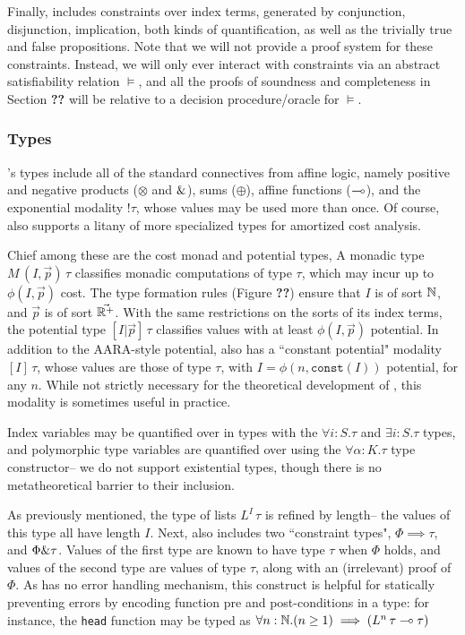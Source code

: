 Finally, \dlambdaamor includes constraints over index terms, generated by conjunction, disjunction, implication, both kinds of quantification, as well as the trivially true and false propositions. Note that we will not provide a proof system for these constraints. Instead, we will only ever interact with constraints via an abstract satisfiability relation $\vDash$, and all the proofs of soundness and completeness in Section \textbf{??} will be relative to a decision procedure/oracle for $\vDash$.

\subsubsection{Types}
\dlambdaamor's types include all of the standard connectives from affine logic, namely positive and negative products ($\otimes$ and $\&$), sums ($\oplus$), affine functions ($\multimap$), and the exponential modality $! \tau$, whose values may be used more than once.
Of course, \dlambdaamor also supports a litany of more specialized types for amortized cost analysis.

Chief among these are the cost monad and potential types, A monadic type $M \, (I,\vec{p}) \, \tau$ classifies monadic computations of type $\tau$, which may incur up to $\phi(I,\vec{p})$ cost. The type formation rules (Figure \textbf{??}) ensure that $I$ is of sort $\mathbb{N}$, and $\vec{p}$ is of sort $\vec{\mathbb{R}^+}$. With the same restrictions on the sorts of its index terms, the potential type $[I|\vec{p}]\, \tau$ classifies values with at least $\phi(I,\vec{p})$ potential. In addition to the AARA-style potential, \dlambdaamor also has a ``constant potential" modality $[I] \, \tau$, whose values are those of type $\tau$, with $I = \phi(n,\texttt{const}(I))$ potential, for any $n$. While not strictly necessary for the theoretical development of \dlambdaamor, this modality is sometimes useful in practice.

Index variables may be quantified over in types with the $\forall i : S.\tau$ and $\exists i : S.\tau$ types, and polymorphic type variables are quantified over using the $\forall \alpha : K .\tau$ type constructor-- we do not support existential types, though there is no metatheoretical barrier to their inclusion.

As previously mentioned, the type of lists $L^I \, \tau$ is refined by length-- the values of this type all have length $I$. Next, \dlambdaamor also includes two ``constraint types", $\Phi \implies \tau$, and $\Phi \& \tau$. Values of the first type are known to have type $\tau$ when $\Phi$ holds, and values of the second type are values of type $\tau$, along with an (irrelevant) proof of $\Phi$. As \lambdaamor has no error handling mechanism, this construct is helpful for statically preventing errors by encoding function pre and post-conditions in a type: for instance, the \texttt{head} function may be typed as $\forall n : \mathbb{N}. (n \geq 1) \implies (L^n \, \tau \multimap \tau)$

